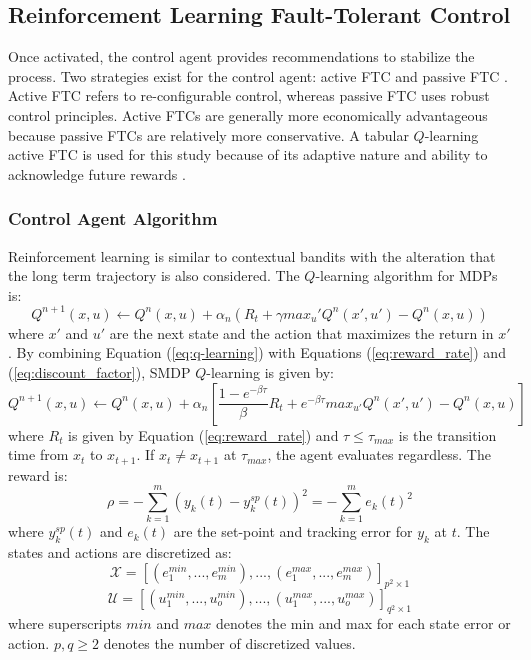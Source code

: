 \subsection{Reinforcement Learning Fault-Tolerant Control}
Once activated, the control agent provides recommendations to stabilize the process.  Two strategies exist for the control agent: active FTC and passive FTC \cite{ftcs_passive_active_ref8}. Active FTC refers to re-configurable control, whereas passive FTC uses robust control principles. Active FTCs are generally more economically advantageous because passive FTCs are relatively more conservative. A tabular $Q$-learning active FTC is used for this study because of its adaptive nature and ability to acknowledge future rewards \cite{rl_control_ref10}. 

\subsubsection{Control Agent Algorithm}
Reinforcement learning is similar to contextual bandits with the alteration that the long term trajectory is also considered. The $Q$-learning algorithm for MDPs is:
\begin{equation}
    Q^{n+1}(x, u) \leftarrow Q^n(x, u) + \alpha_n(R_t + \gamma max_u' Q^n(x', u') - Q^n(x, u))
    \label{eq:q-learning}
\end{equation}
where $x'$ and $u'$ are the next state and the action that maximizes the return in $x'$. By combining Equation (\ref{eq:q-learning}) with Equations (\ref{eq:reward_rate}) and (\ref{eq:discount_factor}), SMDP $Q$-learning is given by:
\begin{equation}
    Q^{n+1}(x, u) \leftarrow Q^n(x, u) + \alpha_n \left[\frac{1 - e^{-\beta \tau}}{\beta}R_t + e^{-\beta \tau} max_{u'} Q^n(x', u') - Q^n(x, u) \right]
\label{eq:q-learning-smdp}
\end{equation}
where $R_t$ is given by Equation (\ref{eq:reward_rate}) and $\tau \leq \tau_{max}$ is the transition time from $x_{t}$ to $x_{t+1}$.  If $x_{t} \neq x_{t+1}$ at $\tau_{max}$, the agent evaluates regardless.  The reward is:
\begin{equation}
\rho= - \sum\limits^m_{k=1} (y_{k}(t) - y_{k}^{sp}(t))^2 = - \sum\limits^m_{k=1} e_k(t)^2
\label{eq:mse}
\end{equation}
where $y_{k}^{sp}(t)$ and $e_k(t)$ are the set-point and tracking error for $y_k$ at $t$.  The states and actions are discretized as: 
\begin{equation}
{\mathcal{X}} = [(e_{1}^{min}, ..., e_{m}^{min}), ..., (e_{1}^{max}, ..., e_{m}^{max})]_{p^2 \times 1}
\label{eq:states}
\end{equation}
\begin{equation}
{\mathcal{U}} = [(u_{1}^{min}, ..., u_{o}^{min}), ..., (u_{1}^{max}, ..., u_{o}^{max})]_{q^2 \times 1}
\label{eq:actions}
\end{equation}
where superscripts $min$ and $max$ denotes the min and max for each state error or action. $p, q \geq 2$ denotes the number of discretized values. 


